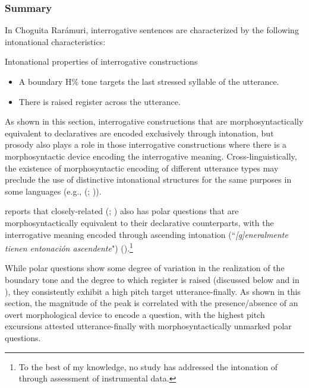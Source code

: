 \subsubsection{Summary}

In Choguita Rarámuri, interrogative sentences are characterized by the following intonational characteristics:


\ea\label{ex: prosodic properties of interrogatives 2}
{Intonational properties of interrogative constructions}

\begin{itemize}
    \item A boundary H\% tone targets the last stressed syllable of the utterance.\\
    \item There is raised register across the utterance.\\
\end{itemize}
\z

As shown in this section, interrogative constructions that are morphosyntactically equivalent to declaratives are encoded exclusively through intonation, but prosody also plays a role in those interrogative constructions where there is a morphosyntactic device encoding the interrogative meaning. Cross-linguistically, the existence of morphosyntactic encoding of different utterance types may preclude the use of distinctive intonational structures for the same purposes in some languages (e.g.,  (; \citealt{mcdonough2002prosody})).

\citet{miller1996guarijio} reports that closely-related  (; ) also has polar questions that are morphosyntactically equivalent to their declarative counterparts, with the interrogative meaning encoded through ascending intonation (``\textit{[g]eneralmente tienen entonación ascendente}") (\citeyear[112]{miller1996guarijio}).\footnote{To the best of my knowledge, no study has addressed the intonation of  through assessment of instrumental data.}

While polar questions show some degree of variation in the realization of the boundary tone and the degree to which register is raised (discussed below and in ), they consistently exhibit a high pitch target utterance-finally. As shown in this section, the magnitude of the peak is correlated with the presence/absence of an overt morphological device to encode a question, with the highest pitch excursions attested utterance-finally with morphosyntactically unmarked polar questions.
